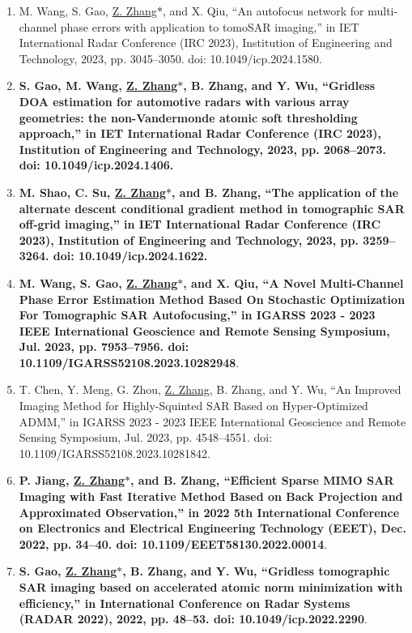 \documentclass[paper=a4,fontsize=11pt]{scrartcl}
\begin{document}
\begin{enumerate}
\item M. Wang, S. Gao, \underline{Z. Zhang$\ast$}, and X. Qiu, ``An autofocus network for multi-channel phase errors with application to tomoSAR imaging,'' in IET International Radar Conference (IRC 2023), Institution of Engineering and Technology, 2023, pp. 3045–3050. doi: 10.1049/icp.2024.1580.

\item \textbf{S. Gao, M. Wang, \underline{Z. Zhang$\ast$}, B. Zhang, and Y. Wu, ``Gridless DOA estimation for automotive radars with various array geometries: the non-Vandermonde atomic soft thresholding approach,'' in IET International Radar Conference (IRC 2023), Institution of Engineering and Technology, 2023, pp. 2068–2073. doi: 10.1049/icp.2024.1406.}

\item \textbf{M. Shao, C. Su, \underline{Z. Zhang$\ast$}, and B. Zhang, ``The application of the alternate descent conditional gradient method in tomographic SAR off-grid imaging,'' in IET International Radar Conference (IRC 2023), Institution of Engineering and Technology, 2023, pp. 3259–3264. doi: 10.1049/icp.2024.1622.}
	
\item \textbf{ M. Wang, S. Gao, \underline{Z. Zhang$\ast$}, and X. Qiu, ``A Novel Multi-Channel Phase Error Estimation Method Based On Stochastic Optimization For Tomographic SAR Autofocusing,'' in IGARSS 2023 - 2023 IEEE International Geoscience and Remote Sensing Symposium, Jul. 2023, pp. 7953–7956. doi: 10.1109/IGARSS52108.2023.10282948}.

\item T. Chen, Y. Meng, G. Zhou, \underline{Z. Zhang}, B. Zhang, and Y. Wu, ``An Improved Imaging Method for Highly-Squinted SAR Based on Hyper-Optimized ADMM,'' in IGARSS 2023 - 2023 IEEE International Geoscience and Remote Sensing Symposium, Jul. 2023, pp. 4548–4551. doi: 10.1109/IGARSS52108.2023.10281842.
	
\item \textbf{P. Jiang, \underline{Z. Zhang$\ast$}, and B. Zhang, ``Efficient Sparse MIMO SAR Imaging with Fast Iterative Method Based on Back Projection and Approximated Observation,'' in 2022 5th International Conference on Electronics and Electrical Engineering Technology (EEET), Dec. 2022, pp. 34–40. doi: 10.1109/EEET58130.2022.00014}.

\item \textbf{S. Gao, \underline{Z. Zhang$\ast$}, B. Zhang, and Y. Wu, ``Gridless tomographic SAR imaging based on accelerated atomic norm minimization with efficiency,'' in International Conference on Radar Systems (RADAR 2022), 2022, pp. 48–53. doi: 10.1049/icp.2022.2290}.


\end{enumerate}
\end{document}

